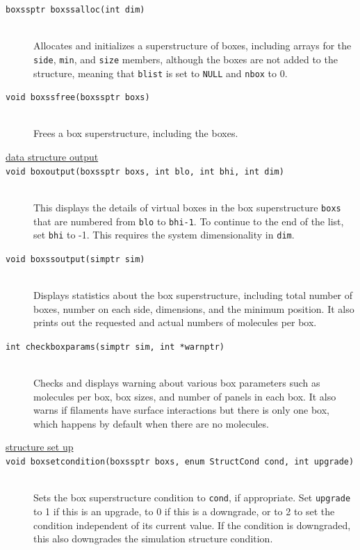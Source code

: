 \documentclass {scrbook}
\newcommand {\ttt} {\texttt}
\begin{document}
\begin{description}
\item[\ttt{boxssptr boxssalloc(int dim)}]
\hfill \\
Allocates and initializes a superstructure of boxes, including arrays for the \ttt{side}, \ttt{min}, and \ttt{size} members, although the boxes are not added to the structure, meaning that \ttt{blist} is set to \ttt{NULL} and \ttt{nbox} to 0.

\item[\ttt{void boxssfree(boxssptr boxs)}]
\hfill \\
Frees a box superstructure, including the boxes.

\item[\underline{data structure output}]

\item[\ttt{void boxoutput(boxssptr boxs, int blo, int bhi, int dim)}]
\hfill \\
This displays the details of virtual boxes in the box superstructure \ttt{boxs} that are numbered from \ttt{blo} to \ttt{bhi-1}. To continue to the end of the list, set \ttt{bhi} to -1. This requires the system dimensionality in \ttt{dim}.

\item[\ttt{void boxssoutput(simptr sim)}]
\hfill \\
Displays statistics about the box superstructure, including total number of boxes, number on each side, dimensions, and the minimum position. It also prints out the requested and actual numbers of molecules per box.

\item[\ttt{int checkboxparams(simptr sim, int *warnptr)}]
\hfill \\
Checks and displays warning about various box parameters such as molecules per box, box sizes, and number of panels in each box. It also warns if filaments have surface interactions but there is only one box, which happens by default when there are no molecules.

\item[\underline{structure set up}]

\item[\ttt{void boxsetcondition(boxssptr boxs, enum StructCond cond, int upgrade)}]
\hfill \\
Sets the box superstructure condition to \ttt{cond}, if appropriate. Set \ttt{upgrade} to 1 if this is an upgrade, to 0 if this is a downgrade, or to 2 to set the condition independent of its current value. If the condition is downgraded, this also downgrades the simulation structure condition.


\end{description}
\end{document}
